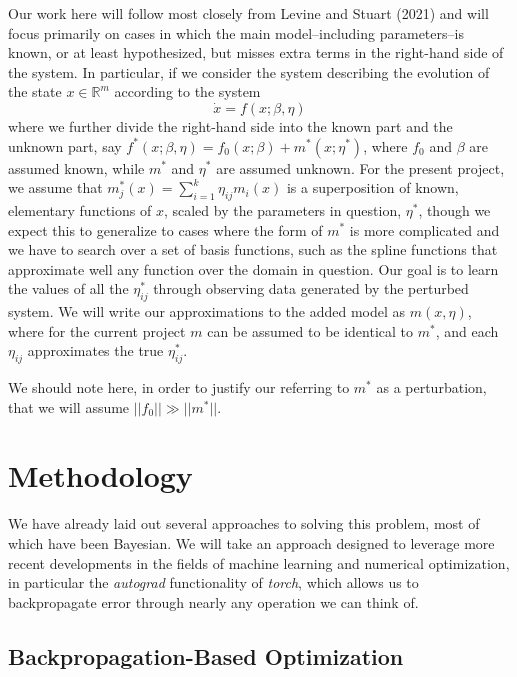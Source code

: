 \documentclass[12pt]{article}
\begin{document}
Our work here will follow most closely from Levine and Stuart (2021) and will focus primarily on cases in which the main model\---including parameters\---is known, or at least hypothesized, but misses extra terms in the right-hand side of the system. In particular, if we consider the system describing the evolution of the state $x \in \mathbb{R}^m$ according to the system $$\dot{x} = f(x;\beta, \eta)$$ where we further divide the right-hand side into the known part and the unknown part, say $f^*(x;\beta, \eta) = f_0(x; \beta) + m^*(x; \eta^*)$, where $f_0$ and $\beta$ are assumed known, while $m^*$ and $\eta^*$ are assumed unknown. For the present project, we assume that $m_j^*(x) = \sum_{i=1}^k \eta_{ij} m_i(x)$ is a superposition of known, elementary functions of $x$, scaled by the parameters in question, $\eta^*$, though we expect this to generalize to cases where the form of $m^*$ is more complicated and we have to search over a set of basis functions, such as the spline functions that approximate well any function over the domain in question. Our goal is to learn the values of all the $\eta^*_{ij}$ through observing data generated by the perturbed system. We will write our approximations to the added model as $m(x,\eta)$, where for the current project $m$ can be assumed to be identical to $m^*$, and each $\eta_{ij}$ approximates the true $\eta^*_{ij}$.

We should note here, in order to justify our referring to $m^*$ as a perturbation, that we will assume $||f_0|| \gg ||m^*||$.




\section{Methodology}

We have already laid out several approaches to solving this problem, most of which have been Bayesian. We will take an approach designed to leverage more recent developments in the fields of machine learning and numerical optimization, in particular the \textit{autograd} functionality of \textit{torch}, which allows us to backpropagate error through nearly any operation we can think of.



\subsection{Backpropagation-Based Optimization}
\end{document}
